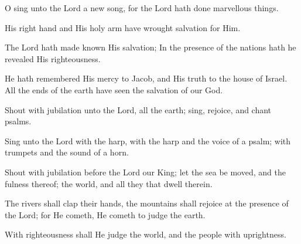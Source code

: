 O sing unto the Lord a new song, for the Lord hath done marvellous things.

His right hand and His holy arm have wrought salvation for Him.

The Lord hath made known His salvation; In the presence of the nations hath he revealed His righteousness.

He hath remembered His mercy to Jacob, and His truth to the house of Israel. All the ends of the earth have seen the salvation of our God.

Shout with jubilation unto the Lord, all the earth; sing, rejoice, and chant psalms.

Sing unto the Lord with the harp, with the harp and the voice of a psalm; with trumpets and the sound of a horn.

Shout with jubilation before the Lord our King; let the sea be moved, and the fulness thereof; the world, and all they that dwell therein.

The rivers shall clap their hands, the mountains shall rejoice at the presence of the Lord; for He cometh, He cometh to judge the earth.

With righteousness shall He judge the world, and the people with uprightness.
